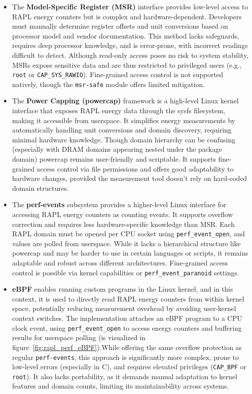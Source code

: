 \begin{itemize}
    \item The \textbf{Model-Specific Register (MSR)} interface provides low-level access to RAPL energy counters but is complex and hardware-dependent. Developers must manually determine register offsets and unit conversions based on processor model and vendor documentation. This method lacks safeguards, requires deep processor knowledge, and is error-prone, with incorrect readings difficult to detect. Although read-only access poses no risk to system stability, MSRs expose sensitive data and are thus restricted to privileged users (e.g., \texttt{root} or \texttt{CAP\_SYS\_RAWIO}). Fine-grained access control is not supported natively, though the \texttt{msr-safe} module offers limited mitigation.
    \item The \textbf{Power Capping (powercap)} framework is a high-level Linux kernel interface that exposes RAPL energy data through the sysfs filesystem, making it accessible from userspace. It simplifies energy measurements by automatically handling unit conversions and domain discovery, requiring minimal hardware knowledge. Though domain hierarchy can be confusing (especially with DRAM domains appearing nested under the package domain) powercap remains user-friendly and scriptable. It supports fine-grained access control via file permissions and offers good adaptability to hardware changes, provided the measurement tool doesn't rely on hard-coded domain structures.
    \item The \textbf{perf-events} subsystem provides a higher-level Linux interface for accessing RAPL energy counters as counting events. It supports overflow correction and requires less hardware-specific knowledge than MSR. Each RAPL domain must be opened per CPU socket using \texttt{perf\_event\_open}, and values are polled from userspace. While it lacks a hierarchical structure like powercap and may be harder to use in certain languages or scripts, it remains adaptable and robust across different architectures. Fine-grained access control is possible via kernel capabilities or \texttt{perf\_event\_paranoid} settings. 
    \item \textbf{eBPF} enables running custom programs in the Linux kernel, and in this context, it is used to directly read RAPL energy counters from within kernel space, potentially reducing measurement overhead by avoiding user-kernel context switches. The implementation attaches an eBPF program to a CPU clock event, using \texttt{perf\_event\_open} to access energy counters and buffering results for userspace polling (is visualized in figure~\ref{fig:rapl_perf_eBPF}).While offering the same overflow protection as regular \texttt{perf-events}, this approach is significantly more complex, prone to low-level errors (especially in C), and requires elevated privileges (\texttt{CAP\_BPF} or \texttt{root}). It also lacks portability, as it demands manual adaptation to kernel features and domain counts, limiting its maintainability across systems.
\end{itemize}
